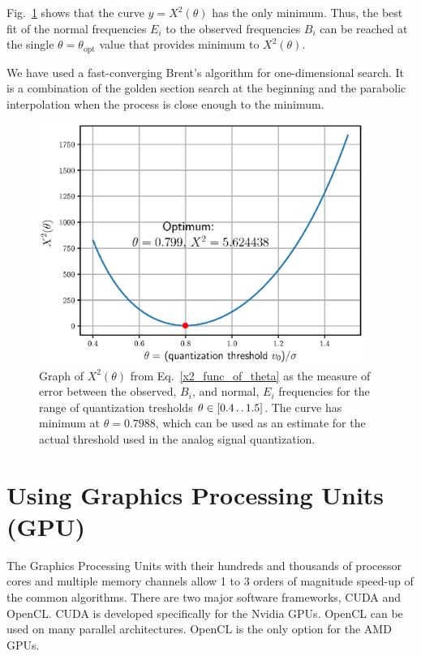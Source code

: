 \documentclass[letterpaper,twoside,12pt]{article}
\begin{document}
Fig.~\ref{optimum_theta} shows that the curve $y = X^2(\theta)$ has the only minimum. Thus, the best fit of the normal frequencies $E_i$ to the observed frequencies $B_i$ can be reached at the single $\theta=\theta_\text{opt}$ value that provides minimum to $X^2(\theta)$. 

We have used a fast-converging Brent's algorithm for one-dimensional search. It is a combination of the golden section search at the beginning and the parabolic interpolation when the process is close enough to the minimum.


\begin{figure}[ht!]
  \begin{center}
  \includegraphics[width=25pc]{fig_optimal_quantization_threshold.eps}
  \caption{\small Graph of $X^2(\theta)$ from Eq.~\eqref{x2_func_of_theta} as the measure of error between the observed, $B_i$, and normal, $E_i$ frequencies for the range of quantization tresholds $\theta\in[0.4 \mathinner{\ldotp\ldotp}1.5]$. The curve has minimum at $\theta = 0.7988$, which can be used as an estimate for the actual threshold used in the analog signal quantization.}
  \label{optimum_theta}
  \end{center}
\end{figure}


\section{Using Graphics Processing Units (GPU)}

The Graphics Processing Units with their hundreds and thousands of processor cores and multiple memory channels allow 1 to 3 orders of magnitude speed-up of the common algorithms. There are two major software frameworks, CUDA and OpenCL. CUDA is developed specifically for the Nvidia GPUs. OpenCL can be used on many parallel architectures. OpenCL is the only option for the AMD GPUs.
\end{document}
